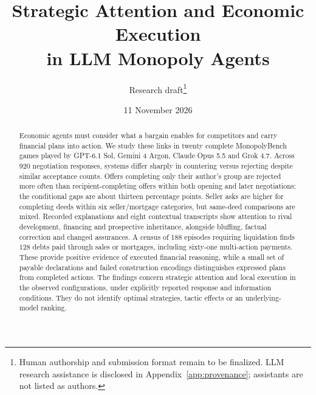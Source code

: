 \documentclass[11pt,letterpaper]{article}
\title{Strategic Attention and Economic Execution\\in LLM Monopoly Agents}
\author{Research draft\thanks{Human authorship and submission format remain to be finalized. LLM research assistance is disclosed in Appendix~\ref{app:provenance}; assistants are not listed as authors.}}
\date{11 November 2026}
\begin{document}



\maketitle
\begin{abstract}
Economic agents must consider what a bargain enables for competitors and carry financial plans into action. We study these links in twenty complete MonopolyBench games played by GPT-6.1 Sol, Gemini 4 Argon, Claude Opus 5.5 and Grok 4.7. Across 920 negotiation responses, systems differ sharply in countering versus rejecting despite similar acceptance counts. Offers completing only their author's group are rejected more often than recipient-completing offers within both opening and later negotiations; the conditional gaps are about thirteen percentage points. Seller asks are higher for completing deeds within six seller/mortgage categories, but same-deed comparisons are mixed. Recorded explanations and eight contextual transcripts show attention to rival development, financing and prospective inheritance, alongside bluffing, factual correction and changed assurances. A census of 188 episodes requiring liquidation finds 128 debts paid through sales or mortgages, including sixty-one multi-action payments. These provide positive evidence of executed financial reasoning, while a small set of payable declarations and failed construction encodings distinguishes expressed plans from completed actions. The findings concern strategic attention and local execution in the observed configurations, under explicitly reported response and information conditions. They do not identify optimal strategies, tactic effects or an underlying-model ranking.
\end{abstract}






\begingroup\small
\setlength{\bibsep}{0pt}

\endgroup
\clearpage\appendix

\end{document}
